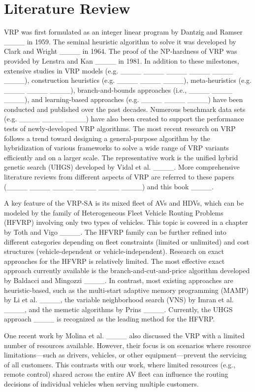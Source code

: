 \section{Literature Review}
\label{sec:literature}
VRP was first formulated as an integer linear program by Dantzig and Ramser ____ in 1959. The seminal heuristic algorithm to solve it was developed by Clark and Wright ____ in 1964. The proof of the NP-hardness of VRP was provided by Lenstra and Kan ____ in 1981. In addition to these milestones, extensive studies in VRP models (e.g. ____
____ ____
____ ____
____), construction heuristics (e.g. ____ ____ ____), meta-heuristics (e.g. ____ ____ ____), branch-and-bounds approaches (i.e., ____ ____ ____), and learning-based approaches (e.g. ____ ____ ____) have been conducted and published over the past decades. Numerous benchmark data sets (e.g. ____ ____ ____) have also been created to support the performance tests of newly-developed VRP algorithms. The most recent research on VRP follows a trend toward designing a general-purpose algorithm by the hybridization of various frameworks to solve a wide range of VRP variants efficiently and on a larger scale. The representative work is the unified hybrid genetic search (UHGS) developed by Vidal et al. ____. More comprehensive literature reviews from different aspects of VRP are referred to these papers (____ ____ ____ ____ ____ ____) and this book ____.

A key feature of the VRP-SA is its mixed fleet of AVs and HDVs, which can be modeled by the family of Heterogeneous Fleet Vehicle Routing Problems (HFVRP) involving only two types of vehicles. This topic is covered in a chapter by Toth and Vigo ____. The HFVRP family can be further refined into different categories depending on fleet constraints (limited or unlimited) and cost structures (vehicle-dependent or vehicle-independent). Research on exact approaches for the HFVRP is relatively limited. The most effective exact approach currently available is the branch-and-cut-and-price algorithm developed by Baldacci and Mingozzi ____. In contrast, most existing approaches are heuristic-based, such as the multi-start adaptive memory programming (MAMP) by Li et al. ____, the variable neighborhood search (VNS) by Imran et al. ____, and the memetic algorithms by Prins ____. Currently, the UHGS approach ____ is recognized as the leading method for the HFVRP.

One recent work by Molina et al. ____ also discussed the VRP with a limited number of resources available. However, their focus is on scenarios where resource limitations—such as drivers, vehicles, or other equipment—prevent the servicing of all customers. This contrasts with our work, where limited resources (e.g., remote control) shared across the entire AV fleet can influence the routing decisions of individual vehicles when serving multiple customers.